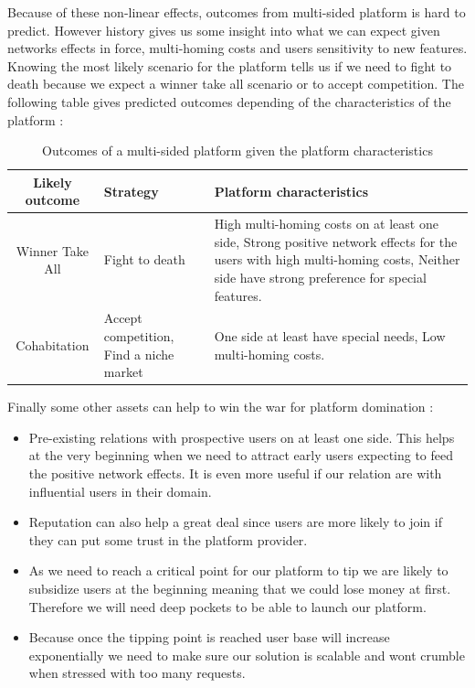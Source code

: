 \documentclass[10pt]{report}
\begin{document}
Because of these non-linear effects, outcomes from multi-sided platform is hard to predict. However history gives us some insight into what we can expect given networks effects in force, multi-homing costs and users sensitivity to new features. Knowing the most likely scenario for the platform tells us if we need to fight to death because we expect a winner take all scenario or to accept competition. The following table gives predicted outcomes depending of the characteristics of the platform :

\begin{table}[!ht]
\begin{center}
\begin{tabularx}{\textwidth}{|c|p{3.5cm}|X|}
\hline
Likely outcome & Strategy & Platform characteristics \tabularnewline
\hline
Winner Take All & Fight to death & High multi-homing costs on at least one side, Strong positive network effects for the users with high multi-homing costs, Neither side have strong preference for special features.\\
\hline
Cohabitation & Accept competition, Find a niche market & One side at least have special needs, Low multi-homing costs.\\
\hline
\end{tabularx}
\end{center}
\caption{Outcomes of a multi-sided platform given the platform characteristics}
\end{table}


Finally some other assets can help to win the war for platform domination \autocite{eisenmann2006strategies} :
\begin{itemize}
\item Pre-existing relations with prospective users on at least one side. This helps at the very beginning when we need to attract early users expecting to feed the positive network effects. It is even more useful if our relation are with influential users in their domain.
\item Reputation can also help a great deal since users are more likely to join if they can put some trust in the platform provider.
\item As we need to reach a critical point for our platform to tip we are likely to subsidize users at the beginning meaning that we could lose money at first. Therefore we will need deep pockets to be able to launch our platform.
\item Because once the tipping point is reached user base will increase exponentially we need to make sure our solution is scalable and wont crumble when stressed with too many requests.
\end{itemize}
\end{document}
